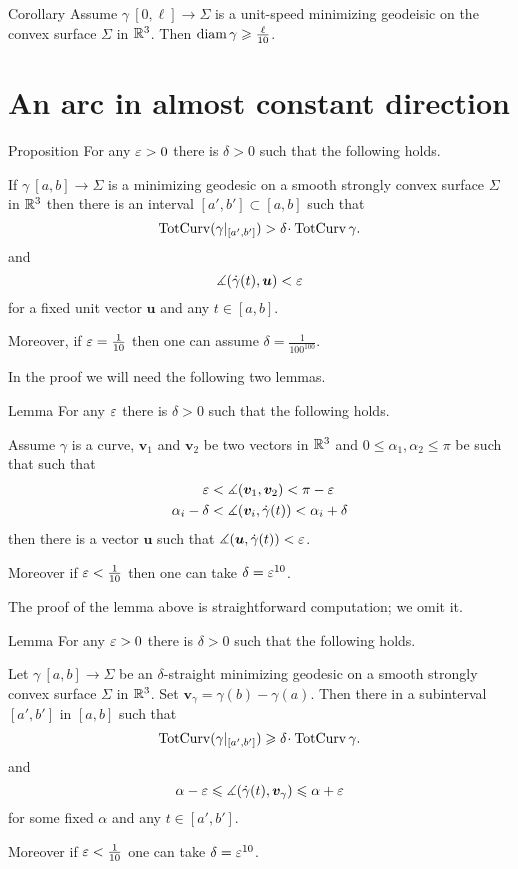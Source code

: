 \documentclass[a4paper,10pt]{amsart}
\begin{document}
\begin{thm}{Corollary}
Assume $\gamma\:[0,\ell]\to \Sigma$ is a unit-speed minimizing geodeisic on the convex surface $\Sigma$ in $\mathbb{R}^3$.
Then $\operatorname{diam} \gamma\geqslant \tfrac\ell{10}$.
\end{thm}


\section{An arc in almost constant direction}

\begin{thm}{Proposition}\label{prop:almost-const}
For any $\varepsilon>0$ there is $\delta>0$ such that the following holds.

If $\gamma\:[a,b]\to\Sigma$ is a minimizing geodesic 
on a smooth strongly convex surface $\Sigma$ in $\mathbb{R}^3$
then there is an interval $[a',b']\subset[a,b]$
such that 
\[\tc(\gamma|_{[a',b']})>\delta\cdot\tc\gamma.\]
and 
\[\measuredangle(\dot\gamma(t),\bm{u})<\varepsilon\] 
for a fixed unit vector $\bm{u}$
and any $t\in[a,b]$.

Moreover, if $\varepsilon=\tfrac1{10}$ then one can assume $\delta=\tfrac1{100^{100}}$.
\end{thm}

In the proof we will need the following two lemmas.

\begin{thm}{Lemma}\label{lem:almost-const-angles}
For any $\varepsilon$ there is $\delta>0$ such that the following holds.

Assume $\gamma$ is a curve,
$\bm{v}_1$ and $\bm{v}_2$  be two vectors in $\mathbb{R}^3$
and $0\le\alpha_1,\alpha_2\le\pi$ be such that
such that 
\begin{align*}
\varepsilon
&<\measuredangle(\bm{v}_1,\bm{v}_2)<\pi-\varepsilon
\\
\alpha_i-\delta
&<\measuredangle(\bm{v}_i,\dot\gamma(t))< \alpha_i+\delta
\end{align*}
then there is a vector $\bm{u}$ such that
$\measuredangle(\bm{u},\dot\gamma(t))<\varepsilon$.

Moreover if $\varepsilon<\tfrac1{10}$ 
then one can take $\delta=\varepsilon^{10}$.
\end{thm}

The proof of the lemma above 
is straightforward computation;
we omit it.

\begin{thm}{Lemma}\label{lem:almost-const}
For any $\varepsilon>0$ there is $\delta>0$
such that the following holds.

Let $\gamma\:[a,b]\to\Sigma$ 
be an $\delta$-straight minimizing geodesic 
on a smooth strongly convex surface $\Sigma$ in $\mathbb{R}^3$.
Set $\bm{v}_\gamma=\gamma(b)-\gamma(a)$.
Then there in a subinterval $[a',b']$ in $[a,b]$
such that 
\[\tc(\gamma|_{[a',b']})\ge\delta\cdot\tc\gamma.\]
and 
\[\alpha-\varepsilon
\leqslant
\measuredangle(\dot\gamma(t),\bm{v}_\gamma)
\leqslant\alpha+\varepsilon\] 
for some fixed $\alpha$
and
any $t\in[a',b']$.

Moreover if $\varepsilon<\tfrac1{10}$ one can take $\delta=\varepsilon^{10}$.
\end{thm}
\end{document}
